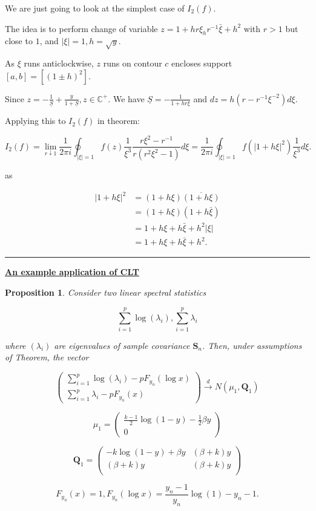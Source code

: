 \documentclass[twoside]{article}
\newtheorem{proposition}[theorem]{Proposition}
\newenvironment{proof}{{\bf Proof:}}{\hfill\rule{2mm}{2mm}}
\begin{document}
\begin{proof}
	We are just going to look at the simplest case of $I_2(f)$.
	
	The idea is to perform change of variable $z=1+hr\xi _ hr^{-1}\bar{\xi}+h^2$ with $r>1$ but close to $1$, and $\lvert \xi\rvert = 1, h=\sqrt{y}.$
	
	As $\xi$ runs anticlockwise, $z$ runs on contour $c$ encloses support $[a,b]=[(1\pm h)^2]$.
	
	Since $z=-\frac{1}{\underline{S}}+\frac{y}{1+\underline{S}}, z\in\mathbb{C}^+$. We have $\underline{S}=-\frac{1}{1+hr\xi}$ and $dz=h(r-r^{-1}\xi^{-2})d\xi$.
	
	Applying this to $I_2(f)$ in theorem:
	
	$$I_2(f)=\lim_{r\downarrow 1}\frac{1}{2\pi i}\oint_{\lvert\xi\rvert =1}f(z)\frac{1}{\xi^3}\frac{r\xi^2-r^{-1}}{r(r^2\xi^2-1)}d\xi=\frac{1}{2\pi i}\oint_{\lvert \xi\rvert =1}f(\lvert 1+h\xi\rvert ^2)\frac{1}{\xi^3}d\xi.$$
	
	as
	
	\begin{equation}
		\begin{split}
			\lvert 1+h\xi\rvert^2&=(1+h\xi)\overline{(1+h\xi)}\\
			&=(1+h\xi)(1+h\bar{\xi})\\
			&=1+h\xi+h\bar{\xi}+h^2\lvert\xi\rvert\\
			&=1+h\xi+h\bar{\xi}+h^2.
		\end{split}
	\end{equation}
\end{proof}

\textbf{\underline{An example application of CLT}}

\begin{proposition}
	Consider two linear spectral statistics
	
	$$\sum^p_{i=1}\log(\lambda_i), \sum^p_{i=1}\lambda_i$$
	
	where $(\lambda_i)$ are eigenvalues of sample covariance $\mathbf{S}_n$. Then, under assumptions of Theorem, the vector
	
	$$\begin{pmatrix}
		\sum^p_{i=1}\log(\lambda_i)-pF_{y_n}(\log x)\\
		\sum^p_{i=1}\lambda_i-pF_{y_n}(x)
	\end{pmatrix}\overset{d}\to N(\mu_1, \mathbf{Q}_1)$$
	
	$$\mu_1=\begin{pmatrix}
		\frac{k-1}{2}\log(1-y)-\frac{1}{2}\beta y\\
		0
	\end{pmatrix}$$
	
	$$\mathbf{Q}_1=\begin{pmatrix}
		-k\log(1-y)+\beta y & (\beta + k)y\\
		(\beta+k)y & (\beta+k)y\\
	\end{pmatrix}$$
	
	$$F_{y_n}(x)=1, F_{y_n}(\log x)=\frac{y_n-1}{y_n}\log(1)-y_n-1.$$
\end{proposition}
\end{document}
